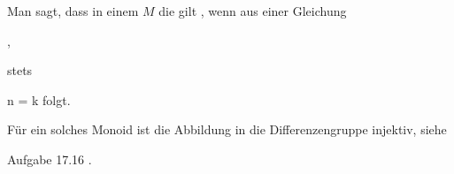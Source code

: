 { }
{





Man sagt, dass in einem
$M$ die  gilt
 {} {,}
wenn aus einer Gleichung

 { , }

stets

\mavergleichskette
{\vergleichskette
{ n
}
{ = }{ k
}
{  }{
}
{    }{
}
{   }{
}
}
{}{}{}
folgt.





}

Für ein solches Monoid ist die Abbildung in die Differenzengruppe injektiv, siehe

Aufgabe 17.16
.
